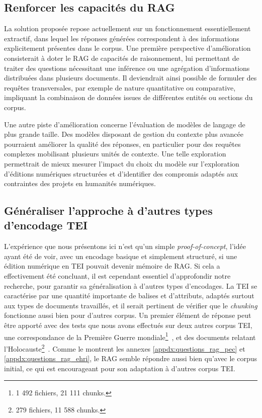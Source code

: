 \documentclass[final, fra]{anthology-ch}     %
\begin{document}
\subsection{Renforcer les capacités du RAG}
La solution proposée repose actuellement sur un fonctionnement essentiellement extractif, dans lequel les réponses générées correspondent à des informations explicitement présentes dans le corpus. Une première perspective d’amélioration consisterait à doter le RAG de capacités de raisonnement, lui permettant de traiter des questions nécessitant une inférence ou une agrégation d’informations distribuées dans plusieurs documents. Il deviendrait ainsi possible de formuler des requêtes transversales, par exemple de nature quantitative ou comparative, impliquant la combinaison de données issues de différentes entités ou sections du corpus. 

Une autre piste d’amélioration concerne l’évaluation de modèles de langage de plus grande taille. Des modèles disposant de gestion du contexte plus avancée pourraient améliorer la qualité des réponses, en particulier pour des requêtes complexes mobilisant plusieurs unités de contexte. Une telle exploration permettrait de mieux mesurer l’impact du choix du modèle sur l’exploration d’éditions numériques structurées et d’identifier des compromis adaptés aux contraintes des projets en humanités numériques. 


\subsection{Généraliser l’approche à d’autres types d’encodage TEI}
L’expérience que nous présentons ici n’est qu’un simple \textit{proof-of-concept}, l’idée ayant été de voir, avec un encodage basique et simplement structuré, si une édition numérique en TEI pouvait devenir mémoire de RAG. Si cela a effectivement été concluant, il est cependant essentiel d'approfondir notre recherche, pour garantir sa généralisation à d’autres types d’encodages. La TEI se caractérise par une quantité importante de balises et d’attributs, adaptés surtout aux types de documents travaillés, et il serait pertinent de vérifier que le \textit{chunking} fonctionne aussi bien pour d’autres corpus. 
Un premier élément de réponse peut être apporté avec des tests que nous avons effectués sur deux autres corpus TEI, une correspondance de la Première Guerre mondiale\footnote{1 492 fichiers, 21 111 chunks.}~\cite{chiffoleau:hal-03628094}, et des documents relatant l’Holocauste\footnote{279 fichiers, 11 588 chunks.}~\cite{beniere:hal-04594190}. Comme le montrent les annexes \ref{appdx:questions_rag_pec} et \ref{appdx:questions_rag_ehri}, le RAG semble répondre aussi bien qu’avec le corpus initial, ce qui est encourageant pour son adaptation à d’autres corpus TEI. 
\end{document}

